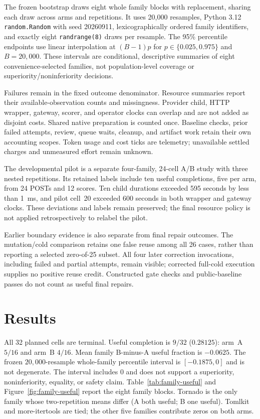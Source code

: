 \documentclass{article}
\begin{document}
The frozen bootstrap draws eight whole family blocks with replacement, sharing
each draw across arms and repetitions. It uses 20,000 resamples, Python 3.12
\texttt{random.Random} with seed 20260911, lexicographically ordered family
identifiers, and exactly eight \texttt{randrange(8)} draws per resample.
The 95\% percentile endpoints use linear interpolation at $(B-1)p$ for
$p\in\{0.025,0.975\}$ and $B=20{,}000$. These intervals are conditional,
descriptive summaries of eight convenience-selected families, not
population-level coverage or superiority/noninferiority decisions.

Failures remain in the fixed outcome denominator. Resource summaries report
their available-observation counts and missingness. Provider child, HTTP
wrapper, gateway, scorer, and operator clocks can overlap and are not added
as disjoint costs. Shared native preparation is counted once. Baseline checks,
prior failed attempts, review, queue waits, cleanup, and artifact work retain
their own accounting scopes. Token usage and cost ticks are telemetry;
unavailable settled charges and unmeasured effort remain unknown.

The developmental pilot is a separate four-family, 24-cell A/B study with
three nested repetitions. Its retained labels include ten useful completions,
five per arm, from 24 POSTs and 12 scores. Ten child durations exceeded 595
seconds by less than 1~ms, and pilot cell~20 exceeded 600 seconds in both
wrapper and gateway clocks. These deviations and labels remain preserved;
the final resource policy is not applied retrospectively to relabel the pilot.

Earlier boundary evidence is also separate from final repair outcomes.
The mutation/cold comparison retains one false reuse among all 26 cases,
rather than reporting a selected zero-of-25 subset. All four later correction
invocations, including failed and partial attempts, remain visible; corrected
full-cold execution supplies no positive reuse credit. Constructed gate checks
and public-baseline passes do not count as useful final repairs.

\section{Results}
\label{sec:results}

All 32 planned cells are terminal. Useful completion is $9/32$
($0.28125$): arm~A $5/16$ and arm~B $4/16$. Mean family B-minus-A useful
fraction is $-0.0625$. The frozen $20{,}000$-resample whole-family percentile
interval is $[-0.1875,0]$ and is not degenerate. The interval includes $0$ and
does not support a superiority, noninferiority, equality, or safety claim.
Table~\ref{tab:family-useful} and Figure~\ref{fig:family-useful} report the
eight family blocks. Tornado is the only family whose two-repetition means
differ (A both useful; B one useful). Tomlkit and more-itertools are tied;
the other five families contribute zeros on both arms.
\end{document}

